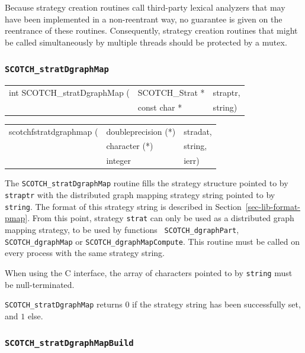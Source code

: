 Because strategy creation routines call third-party lexical analyzers
that may have been implemented in a non-reentrant way, no guarantee is
given on the reentrance of these routines. Consequently, strategy
creation routines that might be called simultaneously by multiple
threads should be protected by a mutex.

\subsubsection{{\tt SCOTCH\_stratDgraphMap}}

\begin{itemize}
\progsyn

{\tt\begin{tabular}{l@{}ll}
int SCOTCH\_stratDgraphMap ( & SCOTCH\_Strat * & straptr, \\
                             & const char *    & string)
\end{tabular}}

{\tt\begin{tabular}{l@{}ll}
scotchfstratdgraphmap ( & doubleprecision (*) & stradat, \\
                        & character (*)       & string,  \\
                        & integer             & ierr)
\end{tabular}}

\progdes

The {\tt SCOTCH\_stratDgraphMap} routine fills the strategy
structure pointed to by {\tt straptr} with the distributed graph
mapping strategy string pointed to by {\tt string}. The format of this
strategy string is described in Section~\ref{sec-lib-format-pmap}.
From this point, strategy {\tt strat} can only be used as a
distributed graph mapping strategy, to be used by functions {\tt
SCOTCH\_\lbt dgraph\lbt Part}, {\tt SCOTCH\_\lbt dgraph\lbt Map} or
{\tt SCOTCH\_\lbt dgraph\lbt Map\lbt Compute}. This routine must be
called on every process with the same strategy string.

When using the C interface, the array of characters pointed to by
{\tt string} must be null-terminated.

\progret

{\tt SCOTCH\_stratDgraphMap} returns $0$ if the strategy string
has been successfully set, and $1$ else.
\end{itemize}

\subsubsection{{\tt SCOTCH\_stratDgraphMapBuild}}

